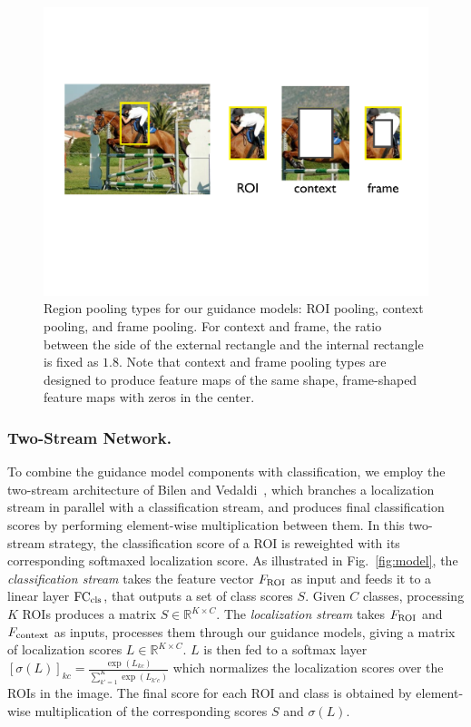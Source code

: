 \begin{figure}[t] \includegraphics[width=\textwidth, trim={1mm 7.5cm 1mm 5cm},
clip]{eccv16_figures/roitransforms} \caption[Region pooling types for our guidance models]{Region pooling types for our guidance models: ROI pooling, context pooling, and frame pooling. For context and frame, the ratio between the side of the external rectangle and the internal rectangle is fixed as 
$1.8$. Note that context and frame pooling types are designed to produce feature maps of the same shape, \ie frame-shaped feature maps with zeros in the center.} \label{fig:roitransforms} \end{figure}



\subsubsection{Two-Stream Network.} To combine the guidance model components
with classification, we employ the two-stream architecture of Bilen and
Vedaldi~\cite{Bilen:2015uo}, which branches a localization stream in parallel
with a classification stream, and produces final classification scores by
performing element-wise multiplication between them. In this two-stream strategy, the
classification score of a ROI is reweighted with its corresponding softmaxed
localization score. As illustrated in Fig.~\ref{fig:model}, the {\em classification stream} takes the feature vector  
$F_{\rm ROI}$ as input and feeds it to a linear layer ${\rm FC_{cls}}$, that outputs a set of class
scores $S$. Given $C$ classes, processing $K$ ROIs produces a matrix $S \in \mathbb{R}^{K \times C}$. The {\em localization stream} takes $F_{\rm ROI}$ and $F_{\rm context}$ as inputs, processes them through our guidance models, giving a matrix of localization
scores $L \in \mathbb{R}^{K \times C}$. $L$ is then fed to a softmax layer $ [ \sigma(L) ]_{kc} = \frac{\exp(L_{kc})}{\sum_{k'=1}^{K}{\exp(L_{k'c})}}$ which normalizes the localization scores over the ROIs in the image. 
The final score for each ROI and class is obtained by element-wise multiplication of the corresponding scores $S$ and $\sigma(L)$. 


